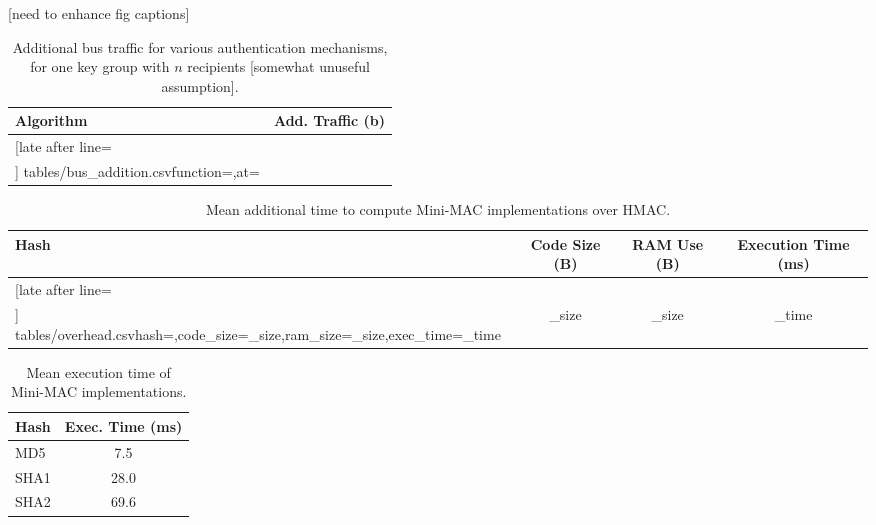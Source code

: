 [need to enhance fig captions]

	
	\begin{table}
	\centering
	\caption{Additional bus traffic for various authentication mechanisms, 
	for one key group with $n$ recipients [somewhat unuseful assumption].}
	\label{tab-traffic}
	\vspace{8pt}
	\begin{tabular}{l|c}%
	\bfseries Algorithm & \bfseries Add. Traffic (b) \\\hline \csvreader[late after line=\\]%
		{tables/bus_addition.csv}{function=\function,at=\at}%
		{\function & \at}%
	\end{tabular}
	\end{table}

	\begin{table}	
	\centering	
	\caption{Mean additional time to compute Mini-MAC implementations over HMAC.}
	\label{tab-overhead}
	\vspace{8pt}
	\begin{tabular}{l|c|c|c}%
	\bfseries Hash & \bfseries Code Size (B) & \bfseries RAM Use (B) & \bfseries Execution Time (ms)\\\hline \csvreader[late after line=\\]%
		{tables/overhead.csv}{hash=\hash,code_size=\code_size,ram_size=\ram_size,exec_time=\exec_time}%
		{\hash & \code_size & \ram_size & \exec_time}%
	\end{tabular}
	\end{table}
	
	\begin{table}
	\centering
	\caption{Mean execution time of Mini-MAC implementations.}
	\label{tab-time}
	\vspace{8pt}
	\begin{tabular}{ @{}l | S[table-format=2.1]  @{}}
		\hspace{2pt}\textbf{Hash} & {\textbf{Exec. Time (ms)}} \\
		\hline 
		\hspace{2pt}MD5 & 7.5 \\
		\hspace{2pt}SHA1 & 28.0 \\
		\hspace{2pt}SHA2 & 69.6 \\ 
	\end{tabular}	
	\end{table}
	
